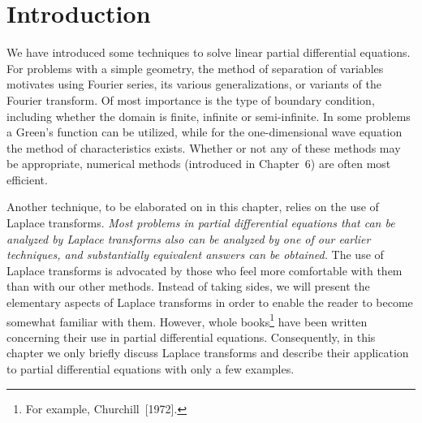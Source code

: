 \section{Introduction}
\label{sec:13.1}

We have introduced some techniques to solve linear partial differential equations.
For problems with a simple geometry, the method of separation of variables motivates using Fourier series, its various generalizations, or variants of the Fourier transform.  Of most importance is the type of boundary condition, including whether the domain is finite, infinite or semi-infinite.  In some problems a Green's function can be utilized, while for the one-dimensional wave equation the method of characteristics exists.  Whether or not any of these methods may be appropriate, numerical methods (introduced in Chapter~6) are often most efficient.

Another technique, to be elaborated on in this chapter, relies on the use of Laplace transforms.  \emph{Most problems in partial differential equations that can be analyzed by Laplace transforms also can be analyzed by one of our earlier techniques, and substantially equivalent answers can be obtained.}  The use of Laplace transforms is advocated by those who feel more comfortable with them than with our other methods.  Instead of taking sides, we will present the elementary aspects of Laplace transforms in order to enable the reader to become somewhat familiar with them.  However, whole books\footnote{For example, Churchill~[1972].} have been written concerning their use in partial differential equations.  Consequently, in this chapter we only briefly discuss Laplace transforms and describe their application to partial differential equations with only a few examples.
